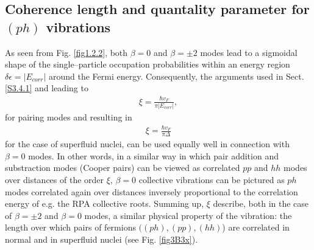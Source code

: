 \begin{subappendices}
 \subsection{Coherence length and quantality parameter for $(ph)$ vibrations}
As seen from Fig. \ref{fig1.2.2}, both $\beta=0$ and $\beta=\pm2$ modes lead to a sigmoidal shape of the single--particle occupation probabilities within an energy region $\delta\epsilon=|E_{corr}|$ around the Fermi energy. Consequently, the arguments used in Sect. \ref{S3.4.1} and leading to 
\begin{align}\label{eq3.B.12}
 \xi=\frac{\hbar v_F}{\pi|E_{corr}|},
 \end{align}
 for pairing modes and resulting in
 \begin{align}
 \xi=\frac{\hbar v_F}{\pi\Delta}
 \end{align} 
 for the case of superfluid nuclei, can be used equally well in connection with $\beta=0$ modes. In other words, in a similar way in which pair addition and substraction modes (Cooper pairs) can be viewed as correlated $pp$ and $hh$ modes over distances of the order $\xi$, $\beta=0$ collective vibrations can be pictured as $ph$ modes correlated again over distances inversely proportional to the correlation energy of e.g. the RPA collective roots. Summing up, $\xi$ describe, both in the case of $\beta=\pm2$ and $\beta=0$ modes, a similar  physical property of the vibration: the  length over which  pairs of fermions $((ph),(pp),(hh)$)  are correlated in normal and in superfluid  nuclei (see Fig. \ref{fig3B3x}). 
       \begin{figure}

\end{figure}
\end{subappendices}
